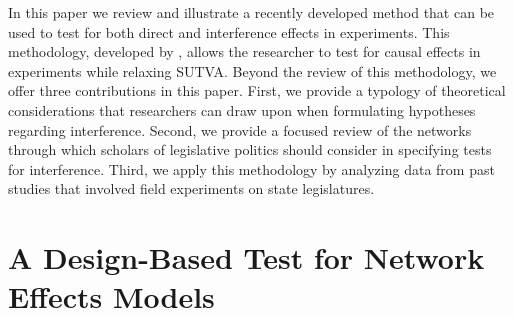 \documentclass[12pt]{article}
\begin{document}
In this paper we review and illustrate a recently developed method that can be used to test for both direct and interference effects in experiments. This methodology, developed by \citet{bowers2012reasoning}, allows the researcher to test for causal effects in experiments while relaxing SUTVA. Beyond the review of this methodology, we offer three contributions in this paper. First, we provide a typology of theoretical considerations that researchers can draw upon when formulating hypotheses regarding interference. Second, we provide a focused review of the networks through which scholars of legislative politics should consider in specifying tests for interference. Third, we apply this methodology by analyzing data from past studies that involved field experiments on state legislatures. 






\section{A Design-Based Test for Network Effects Models}
\end{document}
